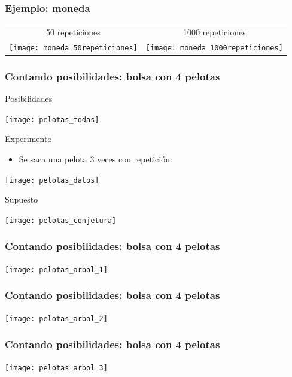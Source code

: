 \documentclass[table]{beamer}
\begin{document}
\begin{frame}
    \frametitle{Ejemplo: moneda}
    \begin{tabular}{cc}
        50 repeticiones & 1000 repeticiones \\
        \texttt{[image: moneda\_50repeticiones]} &
        \texttt{[image: moneda\_1000repeticiones]}
    \end{tabular}
\end{frame}

\iffalse
\begin{frame}
    \frametitle{Contando posibilidades: bolsa con 4 pelotas}
    \begin{block}{Posibilidades}
        \begin{center}
            \texttt{[image: pelotas\_todas]}
        \end{center}
    \end{block}
    \begin{block}{Experimento}
        \begin{itemize}
            \item Se saca una pelota 3 veces con repetición:
        \end{itemize}
        \begin{center}
            \texttt{[image: pelotas\_datos]}
        \end{center}
    \end{block}
    \begin{block}{Supuesto}
        \begin{center}
            \texttt{[image: pelotas\_conjetura]}
        \end{center}
    \end{block}
\end{frame}

\begin{frame}
    \frametitle{Contando posibilidades: bolsa con 4 pelotas}
    \begin{center}
        \texttt{[image: pelotas\_arbol\_1]}
    \end{center}
\end{frame}

\begin{frame}
    \frametitle{Contando posibilidades: bolsa con 4 pelotas}
    \begin{center}
        \texttt{[image: pelotas\_arbol\_2]}
    \end{center}
\end{frame}

\begin{frame}
    \frametitle{Contando posibilidades: bolsa con 4 pelotas}
    \begin{center}
        \texttt{[image: pelotas\_arbol\_3]}
    \end{center}
\end{frame}
\end{document}
